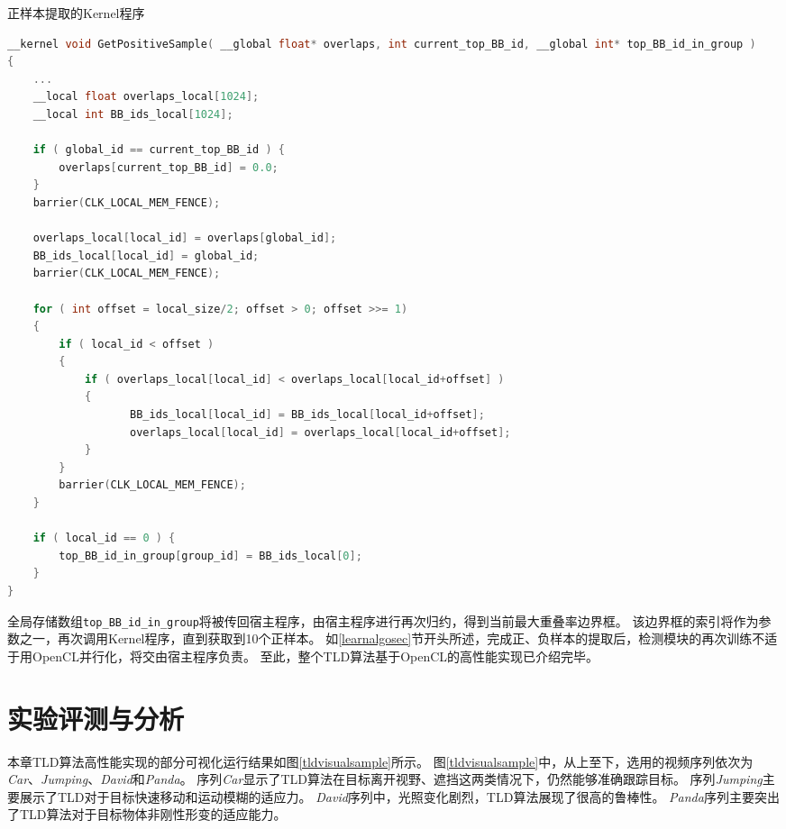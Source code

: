 \begin{table}
\caption{正样本提取的Kernel程序}
\label{positivesamplecode}
\begin{lstlisting}[language=C++, basicstyle=\ttfamily\footnotesize]    
__kernel void GetPositiveSample( __global float* overlaps, int current_top_BB_id, __global int* top_BB_id_in_group )
{			
    ...
    __local float overlaps_local[1024];
    __local int BB_ids_local[1024];

    if ( global_id == current_top_BB_id ) {
        overlaps[current_top_BB_id] = 0.0;
    }
    barrier(CLK_LOCAL_MEM_FENCE);

    overlaps_local[local_id] = overlaps[global_id];
    BB_ids_local[local_id] = global_id;
    barrier(CLK_LOCAL_MEM_FENCE);

    for ( int offset = local_size/2; offset > 0; offset >>= 1) 
    {
        if ( local_id < offset ) 
        {
            if ( overlaps_local[local_id] < overlaps_local[local_id+offset] )
            {
                   BB_ids_local[local_id] = BB_ids_local[local_id+offset];
                   overlaps_local[local_id] = overlaps_local[local_id+offset];
            }
        }
        barrier(CLK_LOCAL_MEM_FENCE);
    }

    if ( local_id == 0 ) {
        top_BB_id_in_group[group_id] = BB_ids_local[0];
    }
}
\end{lstlisting}
\end{table}

全局存储数组\texttt{top\_BB\_id\_in\_group}将被传回宿主程序，由宿主程序进行再次归约，得到当前最大重叠率边界框。
该边界框的索引将作为参数之一，再次调用Kernel程序，直到获取到10个正样本。
如\ref{learnalgosec}节开头所述，完成正、负样本的提取后，检测模块的再次训练不适于用OpenCL并行化，将交由宿主程序负责。
至此，整个TLD算法基于OpenCL的高性能实现已介绍完毕。

\section{实验评测与分析}
本章TLD算法高性能实现的部分可视化运行结果如图\ref{tldvisualsample}所示。
图\ref{tldvisualsample}中，从上至下，选用的视频序列依次为\textit{Car}、\textit{Jumping}、\textit{David}和\textit{Panda}。
序列\textit{Car}显示了TLD算法在目标离开视野、遮挡这两类情况下，仍然能够准确跟踪目标。
序列\textit{Jumping}主要展示了TLD对于目标快速移动和运动模糊的适应力。
\textit{David}序列中，光照变化剧烈，TLD算法展现了很高的鲁棒性。
\textit{Panda}序列主要突出了TLD算法对于目标物体非刚性形变的适应能力。

